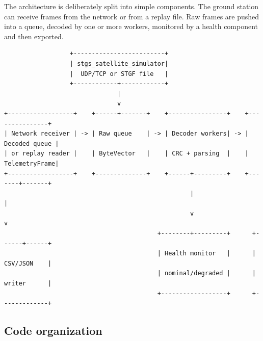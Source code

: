 \documentclass[11pt,a4paper]{article}
\begin{document}
The architecture is deliberately split into simple components. The ground station can receive frames from the network or from a replay file. Raw frames are pushed into a queue, decoded by one or more workers, monitored by a health component and then exported.

\begin{lstlisting}
                  +-------------------------+
                  | stgs_satellite_simulator|
                  |  UDP/TCP or STGF file   |
                  +------------+------------+
                               |
                               v
+------------------+    +------+-------+    +----------------+    +---------------+
| Network receiver | -> | Raw queue    | -> | Decoder workers| -> | Decoded queue |
| or replay reader |    | ByteVector   |    | CRC + parsing  |    | TelemetryFrame|
+------------------+    +--------------+    +------+---------+    +-------+-------+
                                                   |                      |
                                                   v                      v
                                          +--------+---------+      +------+------+
                                          | Health monitor   |      | CSV/JSON    |
                                          | nominal/degraded |      | writer      |
                                          +------------------+      +-------------+
\end{lstlisting}

\subsection{Code organization}
\end{document}
